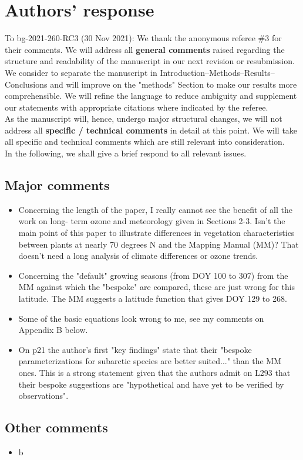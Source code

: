 \documentclass{scrartcl}
\begin{document}
\section*{Authors' response}
To bg-2021-260-RC3 (30 Nov 2021):
We thank the anonymous referee \#3 for their comments.
We will address all \textbf{general comments} raised regarding the structure and readability of the manuscript in our next revision or resubmission. We consider to separate the manuscript in Introduction--Methods--Results--Conclusions and will improve on the "methods" Section to make our results more comprehensible. We will refine the language to reduce ambiguity and supplement our statements with appropriate citations where indicated by the referee.\\
As the manuscript will, hence, undergo major structural changes, we will not address all \textbf{specific / technical comments} in detail at this point. We will take all specific and technical comments which are still relevant into consideration.\\
In the following, we shall give a brief respond to all relevant issues.

\subsection*{Major comments} 
\begin{itemize}
    
    \item {\color{blue}Concerning the length of the paper, I really cannot see the benefit of all the work on long-
    term ozone and meteorology given in Sections 2-3. Isn't the main point of this paper to
    illustrate differences in vegetation characteristics between plants at nearly 70 degrees N
    and the Mapping Manual (MM)? That doesn't need a long analysis of climate differences or
    ozone trends.}
    
    \item {\color{blue}Concerning the "default" growing seasons (from DOY 100 to 307) from the MM against
    which the "bespoke" are compared, these are just wrong for this latitude. The MM
    suggests a latitude function that gives DOY 129 to 268.}
    
    \item {\color{blue}Some of the basic equations look wrong to me, see my comments on Appendix B below.}
    
    \item {\color{blue}On p21 the author's first "key findings" state that their "bespoke parameterizations for
    subarctic species are better suited..." than the MM ones. This is a strong statement given
    that the authors admit on L293 that their bespoke suggestions are "hypothetical and have
    yet to be verified by observations".}

\end{itemize}

\subsection*{Other comments} 
\begin{itemize}
    
\item {\color{blue}b}

\end{itemize}
\end{document}
